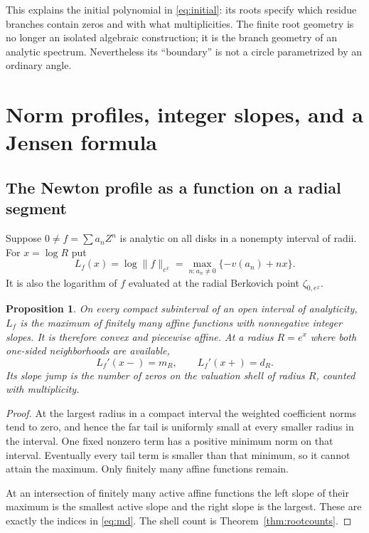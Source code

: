 \documentclass[11pt,a4paper]{article}
\numberwithin{equation}{section}
\newtheorem{proposition}[theorem]{Proposition}
\theoremstyle{definition}
\theoremstyle{remark}
\newcommand{\Gauss}[2]{\lVert#1\rVert_{#2}}
\begin{document}
This explains the initial polynomial in \eqref{eq:initial}: its roots specify
which residue branches contain zeros and with what multiplicities. The finite
root geometry is no longer an isolated algebraic construction; it is the branch
geometry of an analytic spectrum. Nevertheless its ``boundary'' is not a
circle parametrized by an ordinary angle.

\section{Norm profiles, integer slopes, and a Jensen formula}
\label{sec:slopes}

\subsection{The Newton profile as a function on a radial segment}
Suppose $0\ne f=\sum a_nZ^n$ is analytic on all disks in a nonempty interval of
radii. For $x=\log R$ put
\begin{equation}\label{eq:profile}
 L_f(x)=\log\Gauss f{e^x}
       =\max_{n:a_n\ne0}\{-v(a_n)+nx\}.
\end{equation}
It is also the logarithm of $f$ evaluated at the radial Berkovich point
$\zeta_{0,e^x}$.

\begin{proposition}\label{prop:slopes}
On every compact subinterval of an open interval of analyticity, $L_f$ is the
maximum of finitely many affine functions with nonnegative integer slopes.
It is therefore convex and piecewise affine. At a radius $R=e^x$ where both
one-sided neighborhoods are available,
\[
 L_f'(x-)=m_R,\qquad L_f'(x+)=d_R.
\]
Its slope jump is the number of zeros on the valuation shell of radius $R$,
counted with multiplicity.
\end{proposition}
\begin{proof}
At the largest radius in a compact interval the weighted coefficient norms
tend to zero, and hence the far tail is uniformly small at every smaller
radius in the interval. One fixed nonzero term has a positive minimum norm on
that interval. Eventually every tail term is smaller than that minimum, so it
cannot attain the maximum. Only finitely many affine functions remain.

At an intersection of finitely many active affine functions the left slope of
their maximum is the smallest active slope and the right slope is the largest.
These are exactly the indices in \eqref{eq:md}. The shell count is
Theorem~\ref{thm:rootcounts}.
\end{proof}
\end{document}
